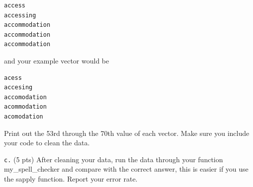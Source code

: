 \documentclass[]{book}
\theoremstyle{definition}
\theoremstyle{definition}
\theoremstyle{definition}
\theoremstyle{remark}
\begin{document}
\begin{verbatim}
access
accessing
accommodation
accommodation
accommodation
\end{verbatim}

and your example vector would be

\begin{verbatim}
acess
accesing
accomodation
acommodation
acomodation
\end{verbatim}

Print out the 53rd through the 70th value of each vector. Make sure you
include your code to clean the data.

\texttt{c.} (5 pts) After cleaning your data, run the data through your
function my\_spell\_checker and compare with the correct answer, this is
easier if you use the sapply function. Report your error rate.


\end{document}
